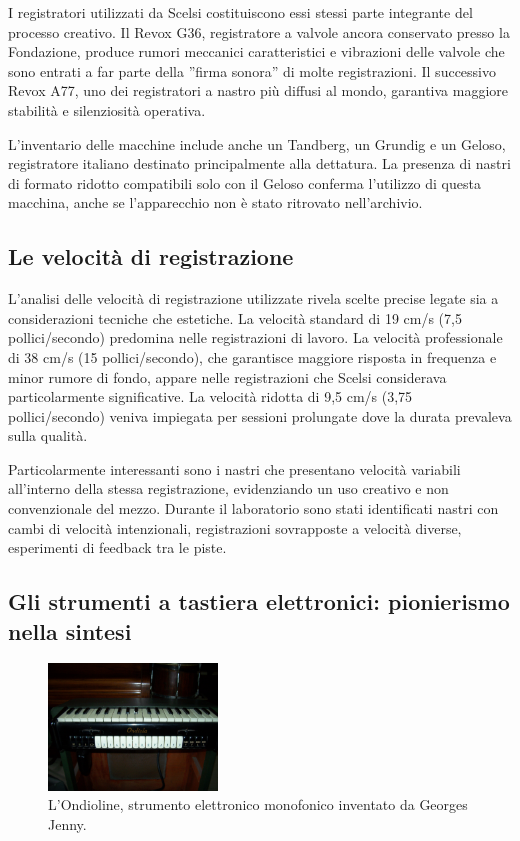 I registratori utilizzati da Scelsi costituiscono essi stessi parte integrante del processo creativo. Il Revox G36, registratore a valvole ancora conservato presso la Fondazione, produce rumori meccanici caratteristici e vibrazioni delle valvole che sono entrati a far parte della ''firma sonora'' di molte registrazioni. Il successivo Revox A77, uno dei registratori a nastro più diffusi al mondo, garantiva maggiore stabilità e silenziosità operativa.

L'inventario delle macchine include anche un Tandberg, un Grundig e un Geloso, registratore italiano destinato principalmente alla dettatura. La presenza di nastri di formato ridotto compatibili solo con il Geloso conferma l'utilizzo di questa macchina, anche se l'apparecchio non è stato ritrovato nell'archivio.

\subsection{Le velocità di registrazione}

L'analisi delle velocità di registrazione utilizzate rivela scelte precise legate sia a considerazioni tecniche che estetiche. La velocità standard di 19 cm/s (7,5 pollici/secondo) predomina nelle registrazioni di lavoro. La velocità professionale di 38 cm/s (15 pollici/secondo), che garantisce maggiore risposta in frequenza e minor rumore di fondo, appare nelle registrazioni che Scelsi considerava particolarmente significative. La velocità ridotta di 9,5 cm/s (3,75 pollici/secondo) veniva impiegata per sessioni prolungate dove la durata prevaleva sulla qualità.

Particolarmente interessanti sono i nastri che presentano velocità variabili all'interno della stessa registrazione, evidenziando un uso creativo e non convenzionale del mezzo. Durante il laboratorio sono stati identificati nastri con cambi di velocità intenzionali, registrazioni sovrapposte a velocità diverse, esperimenti di feedback tra le piste.


\subsection{Gli strumenti a tastiera elettronici: pionierismo nella sintesi}
\begin{figure} %
    \centering
    \includegraphics[width=0.4\textwidth]{docs/img/Ondiola_A-0062.jpg}
    \caption{L'Ondioline, strumento elettronico monofonico inventato da Georges Jenny.}
\end{figure}


